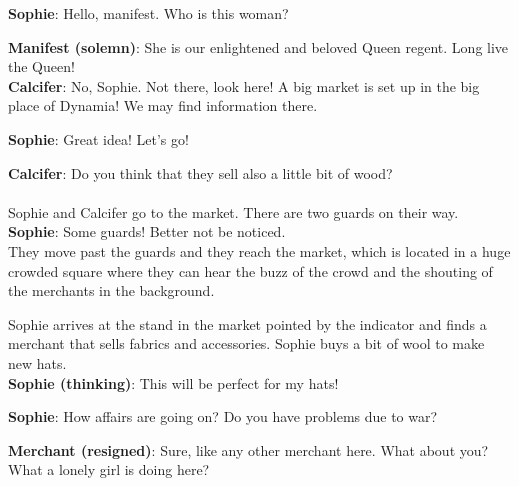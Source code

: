 \textbf{Sophie}: Hello, manifest. Who is this woman?

\textbf{Manifest (solemn)}: She is our enlightened and beloved Queen regent. Long live the Queen!\\

\textbf{Calcifer}: No, Sophie. Not there, look here! A big market is set up in the big place of Dynamia! We may find information there.

\textbf{Sophie}: Great idea! Let's go!

\textbf{Calcifer}: Do you think that they sell also a little bit of wood?\\

\\

\noindent Sophie and Calcifer go to the market. There are two guards on their way.\\

\textbf{Sophie}: Some guards! Better not be noticed.\\

\noindent They move past the guards and they reach the market, which is located in a huge crowded square where they can hear the buzz of the crowd and the shouting of the merchants in the background.


\noindent Sophie arrives at the stand in the market pointed by the indicator and finds a merchant that sells fabrics and accessories.
Sophie buys a bit of wool to make new hats.\\

\textbf{Sophie (thinking)}: This will be perfect for my hats!

\textbf{Sophie}: How affairs are going on? Do you have problems due to war?

\textbf{Merchant (resigned)}: Sure, like any other merchant here. What about you? What a lonely girl is doing here?\\

